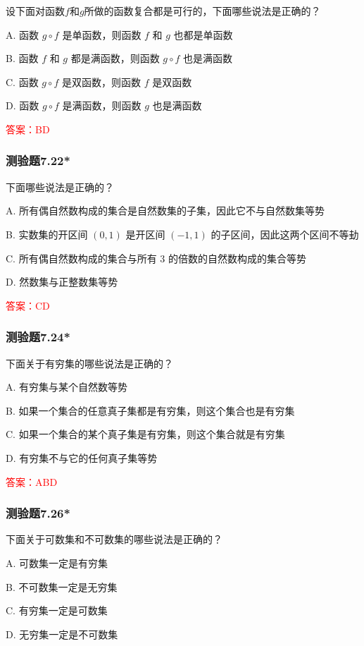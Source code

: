 \documentclass[UTF8, heading=true]{ctexart}
\begin{document}
设下面对函数$f$和$g$所做的函数复合都是可行的，下面哪些说法是正确的？

A. 函数 $g \circ f$ 是单函数，则函数 $f$ 和 $g$ 也都是单函数

B. 函数 $f$ 和 $g$ 都是满函数，则函数 $g \circ f$ 也是满函数

C. 函数 $g \circ f$ 是双函数，则函数 $f$ 是双函数

D. 函数 $g \circ f$ 是满函数，则函数 $g$ 也是满函数

\textcolor{red}{答案：BD}

\subsubsection{测验题7.22*}

下面哪些说法是正确的？

A. 所有偶自然数构成的集合是自然数集的子集，因此它不与自然数集等势

B. 实数集的开区间 $(0,1)$ 是开区间 $(-1,1)$ 的子区间，因此这两个区间不等劸

C. 所有偶自然数构成的集合与所有 3 的倍数的自然数构成的集合等势

D. 然数集与正整数集等势

\textcolor{red}{答案：CD}

\subsubsection{测验题7.24*}

下面关于有穷集的哪些说法是正确的？

A. 有穷集与某个自然数等势

B. 如果一个集合的任意真子集都是有穷集，则这个集合也是有穷集

C. 如果一个集合的某个真子集是有穷集，则这个集合就是有穷集

D. 有穷集不与它的任何真子集等势

\textcolor{red}{答案：ABD}


\subsubsection{测验题7.26*}

下面关于可数集和不可数集的哪些说法是正确的？

A. 可数集一定是有穷集

B. 不可数集一定是无穷集

C. 有穷集一定是可数集

D. 无穷集一定是不可数集
\end{document}
